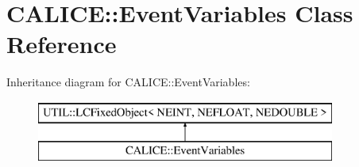 \section{C\-A\-L\-I\-C\-E\-:\-:Event\-Variables Class Reference}
\label{classCALICE_1_1EventVariables}
Inheritance diagram for C\-A\-L\-I\-C\-E\-:\-:Event\-Variables\-:\begin{figure}[H]
\begin{center}
\leavevmode
\includegraphics[height=2.000000cm]{classCALICE_1_1EventVariables}
\end{center}
\end{figure}
